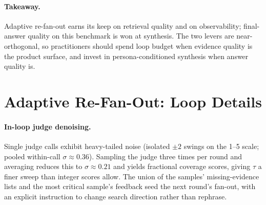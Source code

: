 \paragraph{Takeaway.}
Adaptive re-fan-out earns its keep on retrieval quality and on observability;
final-answer quality on this benchmark is won at synthesis. The two levers
are near-orthogonal, so practitioners should spend loop budget when evidence
quality is the product surface, and invest in persona-conditioned synthesis
when answer quality is.


\section{Adaptive Re-Fan-Out: Loop Details}
\label{app:refanout-details}

\paragraph{In-loop judge denoising.}
Single judge calls exhibit heavy-tailed noise (isolated $\pm2$ swings on the
1--5 scale; pooled within-call $\sigma\approx0.36$). Sampling the judge three
times per round and averaging reduces this to $\sigma\approx0.21$ and yields
fractional coverage scores, giving $\tau$ a finer sweep than integer scores
allow. The union of the samples' missing-evidence lists and the most critical
sample's feedback seed the next round's fan-out, with an explicit instruction
to change search direction rather than rephrase.

